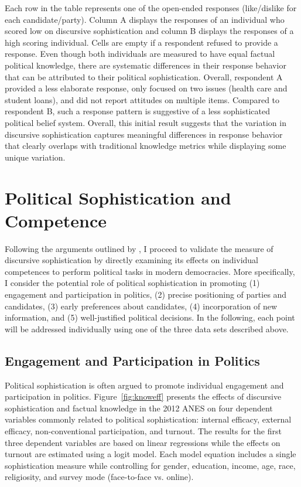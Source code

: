 \documentclass[12pt]{article}
\begin{document}
Each row in the table represents one of the open-ended responses (like/dislike for each candidate/party). Column A displays the responses of an individual who scored low on discursive sophistication and column B displays the responses of a high scoring individual. Cells are empty if a respondent refused to provide a response. Even though both individuals are measured to have equal factual political knowledge, there are systematic differences in their response behavior that can be attributed to their political sophistication. Overall, respondent A provided a less elaborate response, only focused on two issues (health care and student loans), and did not report attitudes on multiple items. Compared to respondent B, such a response pattern is suggestive of a less sophisticated political belief system. Overall, this initial result suggests that the variation in discursive sophistication captures meaningful differences in response behavior that clearly overlaps with traditional knowledge metrics while displaying some unique variation.

\section*{Political Sophistication and Competence}

Following the arguments outlined by \citet{lupia2006elitism,lupia2015uninformed}, I proceed to validate the measure of discursive sophistication by directly examining its effects on individual competences to perform political tasks in modern democracies. More specifically, I consider the potential role of political sophistication in promoting (1) engagement and participation in politics, (2) precise positioning of parties and candidates, (3) early preferences about candidates, (4) incorporation of new information, and (5) well-justified political decisions. In the following, each point will be addressed individually using one of the three data sets described above.

\subsection*{Engagement and Participation in Politics}

Political sophistication is often argued to promote individual engagement and participation in politics. Figure~\ref{fig:knoweff} presents the effects of discursive sophistication and factual knowledge in the 2012 ANES on four dependent variables commonly related to political sophistication: internal efficacy, external efficacy, non-conventional participation, and turnout. The results for the first three dependent variables are based on linear regressions while the effects on turnout are estimated using a logit model. Each model equation includes a single sophistication measure while controlling for gender, education, income, age, race, religiosity, and survey mode (face-to-face vs. online). 
\end{document}
